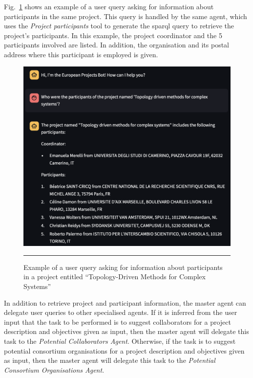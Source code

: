 Fig.~\ref{fig:example-participants-of-topology-driven-methods-for-complex-systems-project} shows an example of a user query asking for information about participants in the same project.
This query is handled by the same agent, which uses the \textit{Project participants} tool to generate the \gls{sparql} query to retrieve the project's participants.
In this example, the project coordinator and the 5 participants involved are listed.
In addition, the organisation and its postal address where this participant is employed is given.

\begin{figure}[htbp]
    \centering
 \includegraphics[width=.8\textwidth]{figures/implementation/example-participants-of-topology-driven-methods-for-complex-systems-project.png}
     \rule{35em}{0.5pt}
    \caption{Example of a user query asking for information about participants in a project entitled ``Topology-Driven Methods for Complex Systems''}
 \label{fig:example-participants-of-topology-driven-methods-for-complex-systems-project}
\end{figure}

In addition to retrieve project and participant information, the master agent can delegate user queries to other specialised agents.
If it is inferred from the user input that the task to be performed is to suggest collaborators for a project description and objectives given as input, then the master agent will delegate this task to the \textit{Potential Collaborators Agent}.
Otherwise, if the task is to suggest potential consortium organisations for a project description and objectives given as input, then the master agent will delegate this task to the \textit{Potential Consortium Organisations Agent}.

